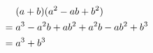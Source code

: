 \documentclass[UTF8, fontset=ubuntu]{ctexart}
\begin{document}
	

	
	

\begin{align}
&\mathrel{\phantom{=}}(a+b)(a^2-ab+b^2) \notag\\
&=a^3-a^2b+ab^2+a^2b-ab^2+b^3\notag\\
&=a^3+b^3
\end{align}


\end{document}
